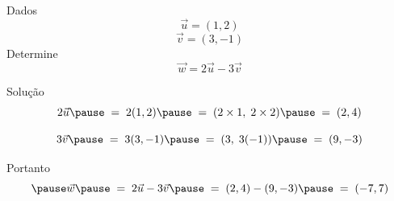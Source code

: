 \begin{question}
  Dados
  \[
    \vec{u} = (1, 2)
  \]
  \[
    \vec{v} = (3, -1)
  \]
  Determine
  \[
    \vec{w} = 2\vec{u} - 3\vec{v}
  \]
\end{question}

\begin{resolution}{Solução}
  \[
    2\vec{u}
    \pause
    \;=\; 2(1, 2)
    \pause
    \;=\; (2\times 1, \; 2\times 2)
    \pause
    \;=\; (2, 4)
  \]

  \pause
  \[
    3\vec{v}
    \pause
    \;=\; 3(3, -1)
    \pause
    \;=\; (3\time 3, \; 3(-1))
    \pause
    \;=\; (9, -3)
  \]

  \pause
  Portanto
  \[
    \pause
    \vec{w}
    \pause
    \;=\; 2\vec{u}-3\vec{v}
    \pause
    \;=\; (2, 4) - (9, -3)
    \pause
    \;=\; (-7, 7)
  \]
\end{resolution}

\endinput
